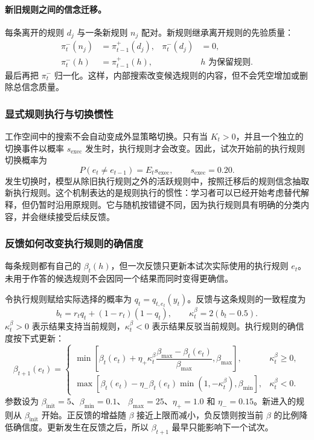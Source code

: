 \paragraph{新旧规则之间的信念迁移。}
每条离开的规则 $d_j$ 与一条新规则 $n_j$ 配对。新规则继承离开规则的先验质量：
\begin{align}
\pi_t^{-}(n_j)&=\pi_{t-1}^{+}(d_j),
&
\pi_t^{-}(d_j)&=0,
\nonumber\\
\pi_t^{-}(h)&=\pi_{t-1}^{+}(h),
&&h\text{ 为保留规则}.
\label{eq:dynamic-pairwise-transfer}
\end{align}
最后再把 $\pi_t^{-}$ 归一化。这样，内部搜索改变候选规则的内容，但不会凭空增加或删除总信念质量。


\subsubsection{显式规则执行与切换惯性}

工作空间中的搜索不会自动变成外显策略切换。只有当 $K_t>0$，并且一个独立的切换事件以概率 $s_{\mathrm{exec}}$ 发生时，执行规则才会改变。因此，试次开始前的执行规则切换概率为
\begin{equation}
P(e_t\ne e_{t-1})=E_ts_{\mathrm{exec}},
\qquad s_{\mathrm{exec}}=0.20.
\label{eq:dynamic-execution-hazard}
\end{equation}
发生切换时，模型从除旧执行规则之外的活跃规则中，按照迁移后的规则信念抽取新执行规则。这个机制表达的是规则执行的惯性：学习者可以已经开始考虑替代解释，但仍暂时沿用原规则。它与随机按错键不同，因为执行规则具有明确的分类内容，并会继续接受后续反馈。


\subsubsection{反馈如何改变执行规则的确信度}

每条规则都有自己的 $\beta_t(h)$，但一次反馈只更新本试次实际使用的执行规则 $e_t$。未用于作答的候选规则不会因同一个结果而同时变得更确信。

令执行规则赋给实际选择的概率为
$q_t=q_{t,e_t}(y_t)$。反馈与这条规则的一致程度为
\begin{equation}
b_t=r_tq_t+(1-r_t)(1-q_t),
\qquad
\kappa_t^{\beta}=2(b_t-0.5).
\label{eq:dynamic-beta-evidence}
\end{equation}
$\kappa_t^{\beta}>0$ 表示结果支持当前规则，$\kappa_t^{\beta}<0$ 表示结果反驳当前规则。执行规则的确信度按下式更新：
\begin{equation}
\beta_{t+1}(e_t)=
\begin{cases}
\min\!\left[
\beta_t(e_t)+\eta_+\kappa_t^{\beta}
\dfrac{\beta_{\max}-\beta_t(e_t)}{\beta_{\max}},
\beta_{\max}\right],
&\kappa_t^{\beta}\geq0,
\\[7pt]
\max\!\left[
\beta_t(e_t)-\eta_-\beta_t(e_t)
\min(1,-\kappa_t^{\beta}),
\beta_{\min}\right],
&\kappa_t^{\beta}<0.
\end{cases}
\label{eq:dynamic-beta-update}
\end{equation}
参数设为 $\beta_{\mathrm{init}}=5$、$\beta_{\min}=0.1$、
$\beta_{\max}=25$、$\eta_+=1.0$ 和 $\eta_-=0.15$。新进入的规则从
$\beta_{\mathrm{init}}$ 开始。正反馈的增益随 $\beta$ 接近上限而减小，负反馈则按当前 $\beta$ 的比例降低确信度。更新发生在反馈之后，所以 $\beta_{t+1}$ 最早只能影响下一个试次。

